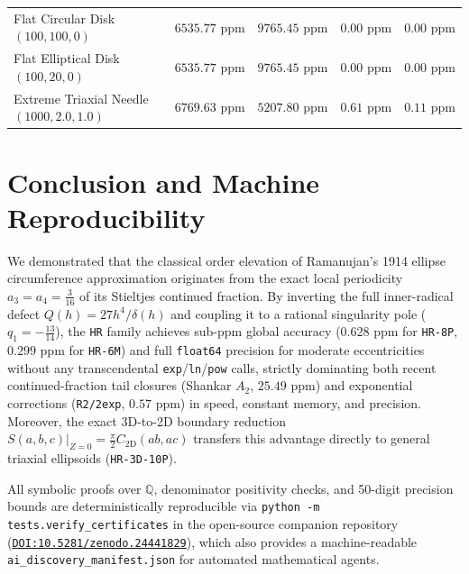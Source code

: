 \documentclass[11pt,a4paper]{article}
\theoremstyle{spacious}
\theoremstyle{spaciousdef}
\begin{document}
\begin{table}[H]
{\begin{tabular}{@{}lcccc@{}}
Flat Circular Disk $(100, 100, 0)$ & $6535.77\text{ ppm}$ & $9765.45\text{ ppm}$ & \textbf{$0.00\text{ ppm}$} & \textbf{$0.00\text{ ppm}$} \\
Flat Elliptical Disk $(100, 20, 0)$ & $6535.77\text{ ppm}$ & $9765.45\text{ ppm}$ & \textbf{$0.00\text{ ppm}$} & \textbf{$0.00\text{ ppm}$} \\
Extreme Triaxial Needle $(1000, 2.0, 1.0)$ & $6769.63\text{ ppm}$ & $5207.80\text{ ppm}$ & \textbf{$0.61\text{ ppm}$} & \textbf{$0.11\text{ ppm}$} \\
\bottomrule
\end{tabular}%
}
\end{table}

\section{Conclusion and Machine Reproducibility}

We demonstrated that the classical order elevation of Ramanujan's 1914 ellipse circumference approximation originates from the exact local periodicity $a_3 = a_4 = \tfrac{3}{16}$ of its Stieltjes continued fraction. By inverting the full inner-radical defect $Q(h) = 27h^4/\delta(h)$ and coupling it to a rational singularity pole ($q_1 = -\tfrac{13}{14}$), the \texttt{HR} family achieves sub-ppm global accuracy ($0.628\text{ ppm}$ for \texttt{HR-8P}, $0.299\text{ ppm}$ for \texttt{HR-6M}) and full \texttt{float64} precision for moderate eccentricities without any transcendental \texttt{exp}/\texttt{ln}/\texttt{pow} calls, strictly dominating both recent continued-fraction tail closures (Shankar $A_2$, $25.49\text{ ppm}$) and exponential corrections (\texttt{R2/2exp}, $0.57\text{ ppm}$) in speed, constant memory, and precision. Moreover, the exact 3D-to-2D boundary reduction $S(a,b,c)|_{Z=0} = \tfrac{\pi}{2}C_{\text{2D}}(ab, ac)$ transfers this advantage directly to general triaxial ellipsoids (\texttt{HR-3D-10P}).

All symbolic proofs over $\mathbb{Q}$, denominator positivity checks, and 50-digit precision bounds are deterministically reproducible via \texttt{python -m tests.verify\_certificates} in the open-source companion repository (\href{https://doi.org/10.5281/zenodo.24441829}{\texttt{DOI:10.5281/zenodo.24441829}}), which also provides a machine-readable \texttt{ai\_discovery\_manifest.json} for automated mathematical agents.
\end{document}
